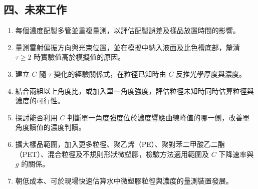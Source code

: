 \subsection*{四、未來工作}
\begin{enumerate}
    \item 每個濃度配製多管並重複量測，以評估配製誤差及樣品放置時間的影響。
    \item 量測雷射偏振方向與光束位置，並在模擬中納入液面及比色槽底部，釐清 $\tau\geq2$ 時實驗值高於模擬值的原因。
    \item 建立 $C$ 隨 $\tau$ 變化的經驗關係式，在粒徑已知時由 $C$ 反推光學厚度與濃度。
    \item 結合兩組以上角度比，或加入單一角度強度，評估粒徑未知時同時估算粒徑與濃度的可行性。
    \item 探討能否利用 $C$ 判斷單一角度強度位於濃度響應曲線峰值的哪一側，改善單角度讀值的濃度判讀。
    \item 擴大樣品範圍，加入更多粒徑、聚乙烯（PE）、聚對苯二甲酸乙二酯（PET）、混合粒徑及不規則形狀微塑膠，檢驗方法適用範圍及 $C$ 下降速率與 $g$ 的關係。
    \item 朝低成本、可於現場快速估算水中微塑膠粒徑與濃度的量測裝置發展。
\end{enumerate}

